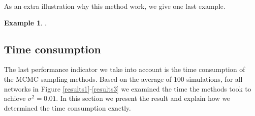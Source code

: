 \documentclass[a4paper, twoside, 11pt]{report}
\theoremstyle{plain}
\theoremstyle{definition}
\newtheorem{example}[thm]{Example}
\theoremstyle{remark}
\begin{document}
As an extra illustration why this method work, we give one last example.
\begin{example}
.
\end{example}

\subsection{Time consumption}\label{sec:time-cons}
The last performance indicator we take into account is the time consumption of the MCMC sampling methods. Based on the average of $100$ simulations, for all networks in Figure \ref{results1}-\ref{results3} we examined the time the methods took to achieve $\sigma^2 = 0.01$. In this section we present the result and explain how we determined the time consumption exactly. \\
\end{document}

